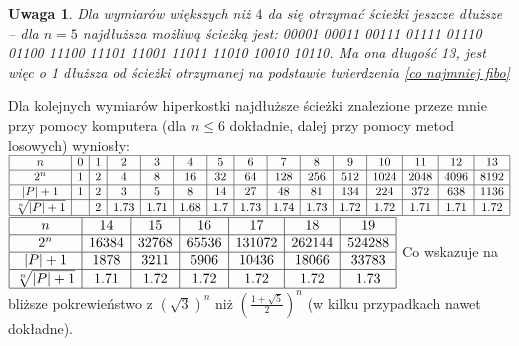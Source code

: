 \documentclass{pracamgr}
\newtheorem{remark}[theorem]{Uwaga}
\begin{document}
    \begin{remark}\label{da sie dluzsze}
     Dla wymiarów większych niż $4$ da się otrzymać ścieżki jeszcze dłuższe -- dla $n=5$ najdłuższa możliwą ścieżką jest:
     00001
     00011
     00111
     01111
     01110
     01100
     11100
     11101
     11001
     11011
     11010
     10010
     10110.\newline
     Ma ona długość 13, jest więc o 1 dłuższa od ścieżki otrzymanej na podstawie twierdzenia \ref{co najmniej fibo}
    \end{remark}
    Dla kolejnych wymiarów hiperkostki najdłuższe ścieżki znalezione przeze mnie przy pomocy komputera
    (dla $n\le 6$ dokładnie, dalej przy pomocy metod losowych) wyniosły:\newline%
    $\begin{array}{|c|c|c|c|c|c|c|c|c|c|c|c|c|c|c|}
     \hline
     n&0&1&2&3&4&5&6&7&8&9&10&11&12&13\\
     \hline
     2^n&1&2&4&8&16&32&64&128&256&512&1024&2048&4096&8192\\
     \hline
     |P|+1&1&2&3&5&8&14&27&48&81&134&224&372&638&1136\\
     \hline
     \sqrt[n]{|P|+1}&&2&1.73&1.71&1.68&1.7&1.73&1.74&1.73&1.72&1.72&1.71&1.71&1.72\\
     \hline
    \end{array}$
    $\begin{array}{|c|c|c|c|c|c|c|}
     \hline
     n&14&15&16&17&18&19\\
     \hline
     2^n&16384&32768&65536&131072&262144&524288\\
     \hline
     |P|+1&1878&3211&5906&10436&18066&33783\\
     \hline
     \sqrt[n]{|P|+1}&1.71&1.72&1.72&1.72&1.72&1.73\\
     \hline
    \end{array}$\newline
    Co wskazuje na bliższe pokrewieństwo z $(\sqrt{3})^n$ niż $(\frac{1+\sqrt{5}}{2})^n$ (w kilku przypadkach nawet dokładne).
    

    
 
  
\end{document}
